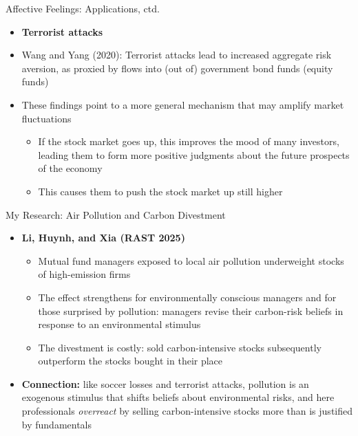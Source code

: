 \documentclass[aspectratio=169, 11pt]{beamer}
\begin{document}
\begin{frame}{Affective Feelings: Applications, ctd.}
\begin{itemize}
\item \textbf{Terrorist attacks}
\item Wang and Yang (2020): Terrorist attacks lead to increased aggregate risk aversion, as proxied by flows into (out of) government bond funds (equity funds)
\item These findings point to a more general mechanism that may amplify market fluctuations  
\begin{itemize}
\item If the stock market goes up, this improves the mood of many investors, leading them to form more positive judgments about the future prospects of the economy
\item This causes them to push the stock market up still higher
\end{itemize}
\end{itemize} 
\end{frame}

\begin{frame}[shrink=5]{My Research: Air Pollution and Carbon Divestment}
\begin{itemize}
\item \textbf{Li, Huynh, and Xia (RAST 2025)}
  \begin{itemize}
  \item Mutual fund managers exposed to local air pollution underweight stocks of high-emission firms
  \item The effect strengthens for environmentally conscious managers and for those surprised by pollution: managers revise their carbon-risk beliefs in response to an environmental stimulus
  \item The divestment is costly: sold carbon-intensive stocks subsequently outperform the stocks bought in their place
  \end{itemize}
\item \textbf{Connection:} like soccer losses and terrorist attacks, pollution is an exogenous stimulus that shifts beliefs about environmental risks, and here professionals \emph{overreact} by selling carbon-intensive stocks more than is justified by fundamentals
\end{itemize}
\end{frame}
\end{document}
